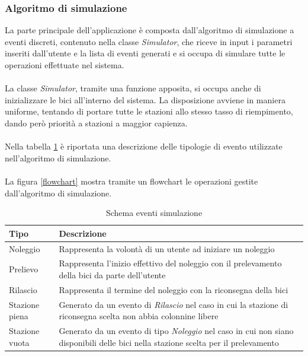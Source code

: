 \documentclass[a4paper, 12pt]{article}
\begin{document}
		\subsubsection{Algoritmo di simulazione}

		La parte principale dell'applicazione è composta dall'algoritmo di simulazione a eventi discreti, contenuto nella classe \textit{Simulator}, che riceve in input i parametri inseriti dall'utente e la lista di eventi generati e si occupa di simulare tutte le operazioni effettuate nel sistema.\\\\
		La classe \textit{Simulator}, tramite una funzione apposita, si occupa anche di inizializzare le bici all'interno del sistema. La disposizione avviene in maniera uniforme, tentando di portare tutte le stazioni allo stesso tasso di riempimento, dando però priorità a stazioni a maggior capienza.\\\\
Nella tabella \ref{eventtype} è riportata una descrizione delle tipologie di evento utilizzate nell'algoritmo di simulazione.\\\\
La figura \ref{flowchart} mostra tramite un flowchart le operazioni gestite dall'algoritmo di simulazione.

		\begin{table}
		\caption{Schema eventi simulazione}
		\label{eventtype}
		\begin{tabularx}{\textwidth}{| l | X |}
		 \hline
		 \textbf{Tipo} & \textbf{Descrizione} \\ [0.5ex] 
		 \hline
		 \hline
		Noleggio & Rappresenta la volontà di un utente ad iniziare un noleggio \\ 
		 \hline
		Prelievo & Rappresenta l'inizio effettivo del noleggio con il prelevamento della bici da parte dell'utente \\
		 \hline
		Rilascio &  Rappresenta il termine del noleggio con la riconsegna della bici \\
		 \hline
		Stazione piena &  Generato da un evento di \textit{Rilascio} nel caso in cui la stazione di riconsegna scelta non abbia colonnine libere \\
		 \hline
		Stazione vuota &  Generato da un evento di tipo \textit{Noleggio} nel caso in cui non siano disponibili delle bici nella stazione scelta per il prelevamento \\
		 \hline
		\end{tabularx}
		\end{table}
\end{document}
